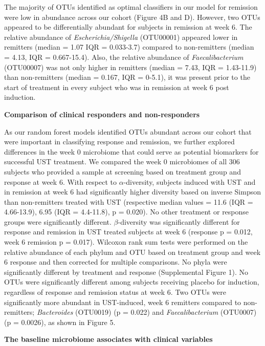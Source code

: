 \documentclass[11pt,]{article}
\begin{document}
The majority of OTUs identified as optimal classifiers in our model for
remission were low in abundance across our cohort (Figure 4B and D).
However, two OTUs appeared to be differentially abundant for subjects in
remission at week 6. The relative abundance of
\emph{Escherichia/Shigella} (OTU00001) appeared lower in remitters
(median = 1.07 IQR = 0.033-3.7) compared to non-remitters (median =
4.13, IQR = 0.667-15.4). Also, the relative abundance of
\emph{Faecalibacterium} (OTU00007) was not only higher in remitters
(median = 7.43, IQR = 1.43-11.9) than non-remitters (median = 0.167, IQR
= 0-5.1), it was present prior to the start of treatment in every
subject who was in remission at week 6 post induction.

\textbf{Comparison of clinical responders and non-responders}

As our random forest models identified OTUs abundant across our cohort
that were important in classifying response and remission, we further
explored differences in the week 0 microbiome that could serve as
potential biomarkers for successful UST treatment. We compared the week
0 microbiomes of all 306 subjects who provided a sample at screening
based on treatment group and response at week 6. With respect to
\({\alpha}\)-diversity, subjects induced with UST and in remission at
week 6 had significantly higher diversity based on inverse Simpson than
non-remitters treated with UST (respective median values = 11.6 (IQR =
4.66-13.9), 6.95 (IQR = 4.4-11.8), p = 0.020). No other treatment or
response groups were significantly different. \({\beta}\)-diversity was
significantly different for response and remission in UST treated
subjects at week 6 (response p = 0.012, week 6 remission p = 0.017).
Wilcoxon rank sum tests were performed on the relative abundance of each
phylum and OTU based on treatment group and week 6 response and then
corrected for multiple comparisons. No phyla were significantly
different by treatment and response (Supplemental Figure 1). No OTUs
were significantly different among subjects receiving placebo for
induction, regardless of response and remission status at week 6. Two
OTUs were significantly more abundant in UST-induced, week 6 remitters
compared to non-remitters; \emph{Bacteroides} (OTU0019) (p = 0.022) and
\emph{Faecalibacterium} (OTU0007) (p = 0.0026), as shown in Figure 5.

\textbf{The baseline microbiome associates with clinical variables}
\end{document}
